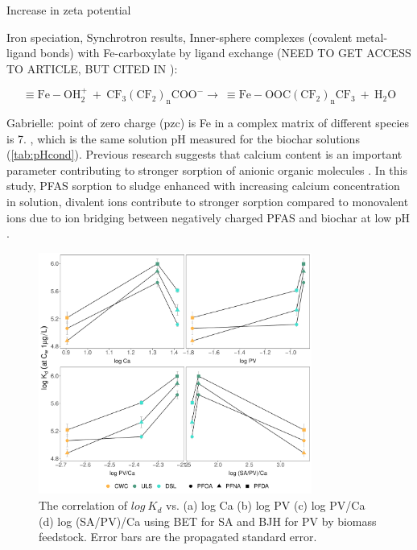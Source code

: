 Increase in zeta potential 

Iron speciation, Synchrotron results, Inner-sphere complexes (covalent metal-ligand bonds) with Fe-carboxylate by ligand exchange \citep{gao2012adsorption}(NEED TO GET ACCESS TO ARTICLE, BUT CITED IN \citep{du2014adsorption}):

\begin{equation}
    \mathrm{\equiv Fe-OH_2^+~ + ~ CF_3(CF_2)_nCOO^- \rightarrow   ~ \equiv Fe-OOC(CF_2)_nCF_3 ~+~ H_2O}
\end{equation}

Gabrielle: point of zero charge (pzc) is Fe in a complex matrix of different species is 7. , which is the same solution pH measured for the biochar solutions (\cref{tab:pHcond}). 
Previous research suggests that calcium content is an important parameter contributing to stronger sorption of anionic organic molecules \citep{higgins2006sorption,sigmund2022sorption}. In this study, PFAS sorption to sludge enhanced with increasing calcium concentration in solution, divalent ions contribute to stronger sorption compared to monovalent ions due to ion bridging between negatively charged PFAS and biochar at low pH \citep{zhang2013sorption,arvaniti2014sorption,arvaniti2015review}. 

\begin{figure}[htb]
    \centering
    \includegraphics[width=0.8\textwidth]{R/figs/Correlation_SAPV_Ca_plot.pdf}
    \caption{The correlation of $log~K_d$ vs. (a) log Ca (b) log PV (c) log PV/Ca (d) log (SA/PV)/Ca using BET for SA and BJH for PV by biomass feedstock. Error bars are the propagated standard error.}
    \label{fig:Kd_SAPV_Ca}
\end{figure}


